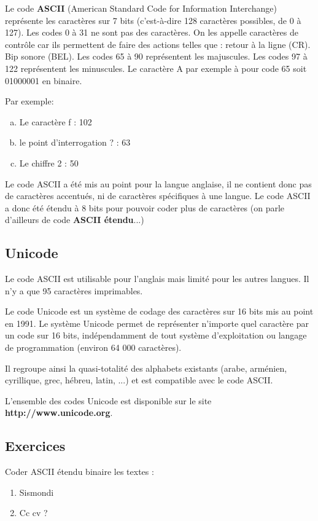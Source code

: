 \documentclass[11pt, a4paper]{book}
\begin{document}
Le code {\bf ASCII} (American Standard Code for Information Interchange) représente les caractères sur 7 bits (c'est-à-dire 128 caractères possibles, de 0 à 127). Les codes 0 à 31 ne sont pas des caractères. On les appelle caractères de contrôle car ils permettent de faire des actions telles que : retour à la ligne (CR). Bip sonore (BEL). Les codes 65 à 90 représentent les majuscules. Les codes 97 à 122 représentent les minuscules. Le caractère A par exemple à pour code 65 soit 01000001 en binaire. 


Par exemple: 
\begin{enumerate}[a)]
\item Le caractère f : 102 
\item le point d'interrogation ? : 63 
\item Le chiffre 2 : 50
\end{enumerate}

Le code ASCII a été mis au point pour la langue anglaise, il ne contient donc pas de caractères accentués, ni de caractères spécifiques à une langue. Le code ASCII a donc été étendu à 8 bits pour pouvoir coder plus de caractères (on parle d'ailleurs de code \textbf{ASCII étendu}...)

\subsection{Unicode}

Le code ASCII est utilisable pour l'anglais mais limité pour les autres langues. Il n'y a que 95 caractères imprimables.

Le code Unicode est un système de codage des caractères sur 16 bits mis au point en 1991. Le système Unicode permet de représenter n'importe quel caractère par un code sur 16 bits, indépendamment de tout système d'exploitation ou langage de programmation (environ 64 000 caractères).

Il regroupe ainsi la quasi-totalité des alphabets existants (arabe, arménien, cyrillique, grec, hébreu, latin, ...) et est compatible avec le code ASCII.

L'ensemble des codes Unicode est disponible sur le site {\bf http://www.unicode.org}.


\subsection{Exercices}
\begin{exercice}
Coder ASCII étendu binaire les textes :
\begin{multicols}{2}
\begin{enumerate}
\item { Sismondi}
\item { Cc cv ?}
\end{enumerate}
\end{multicols}
\end{exercice}
\end{document}
